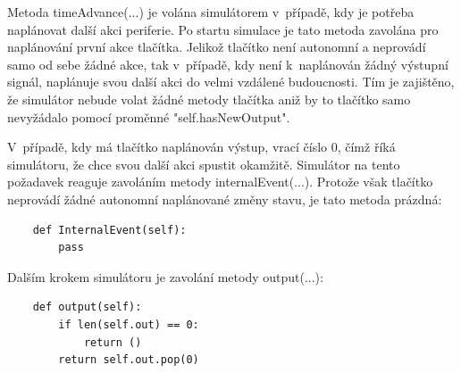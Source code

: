 Metoda timeAdvance(...) je volána simulátorem v~případě, kdy je potřeba naplánovat další akci periferie. Po startu simulace je tato metoda zavolána pro naplánování první akce tlačítka. Jelikož tlačítko není autonomní a neprovádí samo od sebe žádné akce, tak v~případě, kdy není k~naplánován žádný výstupní signál, naplánuje svou další akci do velmi vzdálené budoucnosti. Tím je zajištěno, že simulátor nebude volat žádné metody tlačítka aniž by to tlačítko samo nevyžádalo pomocí proměnné "self.hasNewOutput".

V~případě, kdy má tlačítko naplánován výstup, vrací číslo 0, čímž říká simulátoru, že chce svou další akci spustit okamžitě. Simulátor na tento požadavek reaguje zavoláním metody internalEvent(...). Protože však tlačítko neprovádí žádné autonomní naplánované změny stavu, je tato metoda prázdná:

\begin{lstlisting}
	def InternalEvent(self):
		pass
\end{lstlisting}

Dalším krokem simulátoru je zavolání metody output(...):

\begin{lstlisting}
	def output(self):
		if len(self.out) == 0:
			return ()
		return self.out.pop(0)
\end{lstlisting}


